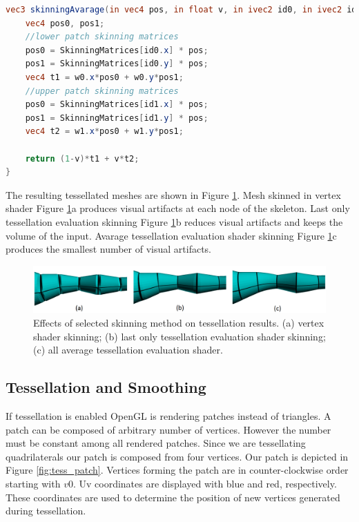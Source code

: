 \linespread{1.2}
\begin{lstlisting}[language=GLSL,caption={Linear Blend Skinning implemented in tessellation evaluation shader, with avaraging of skinning information from all patch vertices.},label={lst:te_avg_skin}]
vec3 skinningAvarage(in vec4 pos, in float v, in ivec2 id0, in ivec2 id1, in vec2 w0, in vec2 w1, in mat4 SkinningMatrices[SKINNING_MATRICES]) {
	vec4 pos0, pos1;
	//lower patch skinning matrices
	pos0 = SkinningMatrices[id0.x] * pos;
	pos1 = SkinningMatrices[id0.y] * pos;
	vec4 t1 = w0.x*pos0 + w0.y*pos1;
	//upper patch skinning matrices
	pos0 = SkinningMatrices[id1.x] * pos;
	pos1 = SkinningMatrices[id1.y] * pos;
	vec4 t2 = w1.x*pos0 + w1.y*pos1;

	return (1-v)*t1 + v*t2;
}
\end{lstlisting} 
\linespread{1.5}

The resulting tessellated meshes are shown in Figure \ref{fig:tess_skin_comp}.
Mesh skinned in vertex shader Figure \ref{fig:tess_skin_comp}a produces visual artifacts at each node of the skeleton.
Last only tessellation evaluation skinning Figure \ref{fig:tess_skin_comp}b reduces visual artifacts and keeps the volume of the input.
Avarage tessellation evaluation shader skinning Figure \ref{fig:tess_skin_comp}c produces the smallest number of visual artifacts.

\begin{figure}[h]
    \centering
    \includegraphics[width=\textwidth]{images/tess_comp}
    \caption[Skinning and Tessellation]{Effects of selected skinning method on tessellation results. (a) vertex shader skinning; (b) last only tessellation evaluation shader skinning; (c) all average tessellation evaluation shader.}
    \label{fig:tess_skin_comp}
\end{figure}

\subsection{Tessellation and Smoothing}

If tessellation is enabled OpenGL is rendering patches instead of triangles.
A patch can be composed of arbitrary number of vertices.
However the number must be constant among all rendered patches.
Since we are tessellating quadrilaterals our patch is composed from four vertices.
Our patch is depicted in Figure \ref{fig:tess_patch}.
Vertices forming the patch are in counter-clockwise order starting with $v0$.
Uv coordinates are displayed with blue and red, respectively.
These coordinates are used to determine the position of new vertices generated during tessellation.

